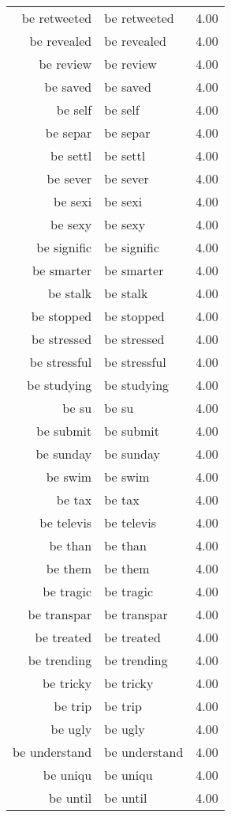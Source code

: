 \begin{table}[ht]
\begin{tabular}{rlr}
  be retweeted & be retweeted & 4.00 \\ 
  be revealed & be revealed & 4.00 \\ 
  be review & be review & 4.00 \\ 
  be saved & be saved & 4.00 \\ 
  be self & be self & 4.00 \\ 
  be separ & be separ & 4.00 \\ 
  be settl & be settl & 4.00 \\ 
  be sever & be sever & 4.00 \\ 
  be sexi & be sexi & 4.00 \\ 
  be sexy & be sexy & 4.00 \\ 
  be signific & be signific & 4.00 \\ 
  be smarter & be smarter & 4.00 \\ 
  be stalk & be stalk & 4.00 \\ 
  be stopped & be stopped & 4.00 \\ 
  be stressed & be stressed & 4.00 \\ 
  be stressful & be stressful & 4.00 \\ 
  be studying & be studying & 4.00 \\ 
  be su & be su & 4.00 \\ 
  be submit & be submit & 4.00 \\ 
  be sunday & be sunday & 4.00 \\ 
  be swim & be swim & 4.00 \\ 
  be tax & be tax & 4.00 \\ 
  be televis & be televis & 4.00 \\ 
  be than & be than & 4.00 \\ 
  be them & be them & 4.00 \\ 
  be tragic & be tragic & 4.00 \\ 
  be transpar & be transpar & 4.00 \\ 
  be treated & be treated & 4.00 \\ 
  be trending & be trending & 4.00 \\ 
  be tricky & be tricky & 4.00 \\ 
  be trip & be trip & 4.00 \\ 
  be ugly & be ugly & 4.00 \\ 
  be understand & be understand & 4.00 \\ 
  be uniqu & be uniqu & 4.00 \\ 
  be until & be until & 4.00 \\ 

\end{tabular}
\end{table}
